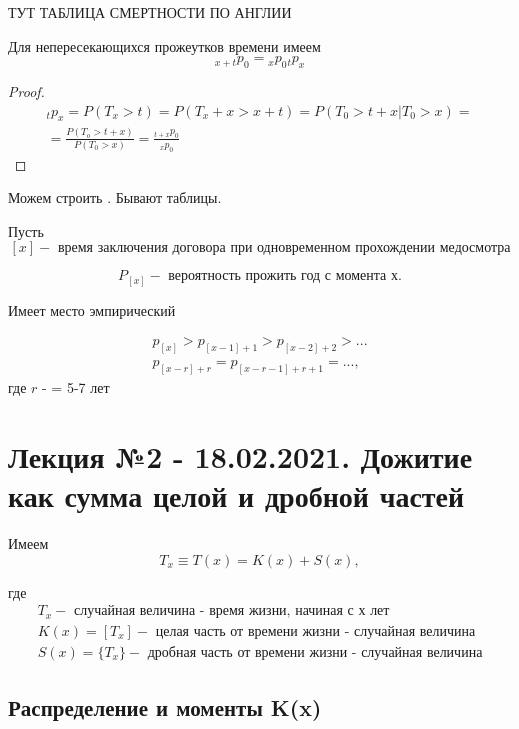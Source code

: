 ТУТ ТАБЛИЦА СМЕРТНОСТИ ПО АНГЛИИ

\begin{clair}
	Для непересекающихся прожеутков времени имеем
	\[{}_{x+t}p_0 = {}_xp_0{}_tp_x	\]
\end{clair}

\begin{proof}
	\begin{gather*}
		{}_tp_x = P(T_x > t) = P(T_x + x > x+t) = P(T_0 > t+x|T_0 > x)=\\
		=\frac{P(T_o > t+x)}{P(T_0>x)}=\frac{{}_{t+x}p_0}{{}_{x}p_0}
	\end{gather*}
\end{proof}

Можем строить . Бывают  таблицы.

Пусть
\[[x]-\text{ время заключения договора при одновременном прохождении медосмотра}\]

\[	P_{[x]}- \text{ вероятность прожить год с момента х.}\]

Имеет место эмпирический

\begin{fact}
	\begin{gather*}
		p_{[x]} > p_{[x-1]+1} > p_{[x-2]+2}>...\\
		p_{[x-r]+r}=p_{[x-r-1]+r+1} = ...,
	\end{gather*}
	где $ r$ -  = 5-7 лет
	
\end{fact}

\chapter{Лекция №2 - 18.02.2021. Дожитие как сумма целой и дробной частей} %
Имеем
\[	T_x \equiv T(x) = K(x) + S(x) ,\]

где 
\begin{gather*}
	T_x - \text{ случайная величина - время жизни, начиная с х лет}\\
	K(x) = [T_x] - \text{ целая часть от времени жизни - случайная величина}\\
	S(x) = \{T_x\} - \text{ дробная часть от времени жизни - случайная величина}
\end{gather*}

\section{Распределение и моменты K(x)} %

